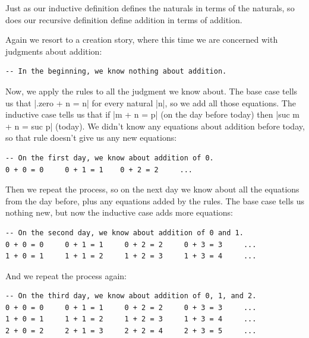 \documentclass{memoir}
\begin{document}
\par
Just as our inductive definition defines the naturals in terms of the naturals,
so does our recursive definition define addition in terms of addition.

\par
Again we resort to a creation story, where this time we are concerned with
judgments about addition:

\par
\begin{verbatim}
-- In the beginning, we know nothing about addition.
\end{verbatim}

\par
Now, we apply the rules to all the judgment we know about. The base case tells
us that \LeanVerb|.zero + n = n| for every natural \LeanVerb|n|, so we add all those equations.
The inductive case tells us that if \LeanVerb|m + n = p| (on the day before today) then
\LeanVerb|suc m + n = suc p| (today). We didn't know any equations about addition before
today, so that rule doesn't give us any new equations:

\par
\begin{verbatim}
-- On the first day, we know about addition of 0.
0 + 0 = 0     0 + 1 = 1    0 + 2 = 2     ...
\end{verbatim}

\par
Then we repeat the process, so on the next day we know about all the equations
from the day before, plus any equations added by the rules. The base case tells
us nothing new, but now the inductive case adds more equations:

\par
\begin{verbatim}
-- On the second day, we know about addition of 0 and 1.
0 + 0 = 0     0 + 1 = 1     0 + 2 = 2     0 + 3 = 3     ...
1 + 0 = 1     1 + 1 = 2     1 + 2 = 3     1 + 3 = 4     ...
\end{verbatim}

\par
And we repeat the process again:

\par
\begin{verbatim}
-- On the third day, we know about addition of 0, 1, and 2.
0 + 0 = 0     0 + 1 = 1     0 + 2 = 2     0 + 3 = 3     ...
1 + 0 = 1     1 + 1 = 2     1 + 2 = 3     1 + 3 = 4     ...
2 + 0 = 2     2 + 1 = 3     2 + 2 = 4     2 + 3 = 5     ...
\end{verbatim}
\end{document}

